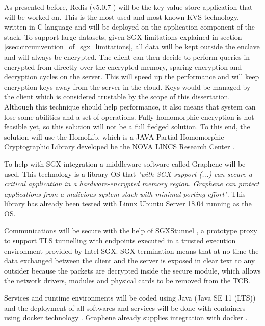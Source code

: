 As presented before, Redis (v5.0.7 \cite{redis:1}) will be the key-value store application that will be worked on. This is the most used and most known \gls{KVS} technology, written in C language and will be deployed on the application component of the stack. To support large datasets, given \gls{SGX} limitations explained in section \ref{ssec:circumvention_of_sgx_limitations}, all data will be kept outside the enclave and will always be encrypted. The client can then decide to perform queries in encrypted from directly over the encrypted memory, sparing encryption and decryption cycles on the server. This will speed up the performance and will keep encryption keys away from the server in the cloud. Keys would be managed by the client which is considered trustable by the scope of this dissertation. Although this technique should help performance, it also means that system can lose some abilities and a set of operations. Fully homomorphic encryption is not feasible yet, so this solution will not be a full fledged solution. To this end, the solution will use the HomoLib, which is a JAVA Partial Homomorphic Cryptographic Library developed be the NOVA LINCS Research Center \cite{homolib:1}.

To help with \gls{SGX} integration a middleware software called Graphene \cite{graphene:1, graphene:2} will be used. This technology is a library \gls{OS} that \textit{"with \gls{SGX} support (...) can secure a critical application in a hardware-encrypted memory region. Graphene can protect applications from a malicious system stack with minimal porting effort"}. This library has already been tested with Linux Ubuntu Server 18.04 running as the \gls{OS}. 

Communications will be secure with the help of SGXStunnel \cite{sgxstunnel:1}, a prototype proxy to support TLS tunnelling with endpoints executed in a trusted execution environment provided by Intel SGX. \gls{SGX} termination means that at no time the data exchanged between the client and the server is exposed in clear text to any outsider because the packets are decrypted inside the secure module, which allows the network drivers, modules and physical cards to be removed from the \gls{TCB}.

Services and runtime environments will be coded using Java (Java SE 11 (LTS)) and the deployment of all softwares and services will be done with containers using docker technology \cite{docker:1}. Graphene already supplies integration with docker \cite{graphene_container:1}.

